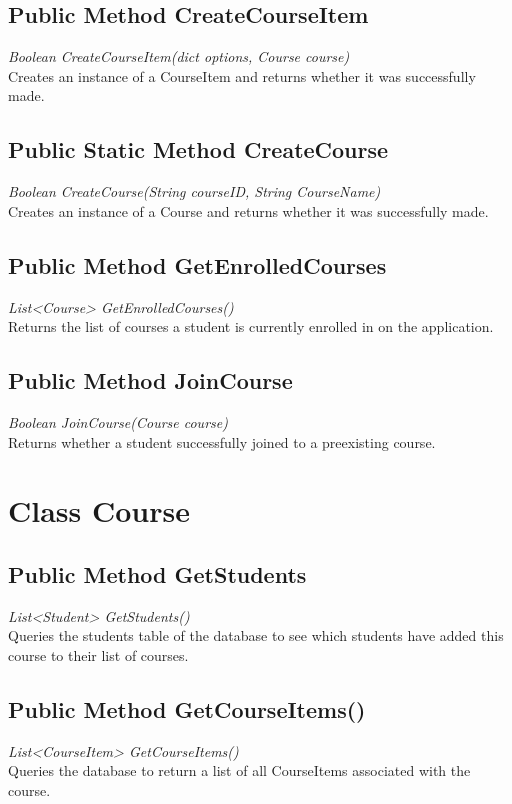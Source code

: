 \documentclass{scrreprt}
\begin{document}
\subsection{Public Method CreateCourseItem}
\textit{Boolean CreateCourseItem(dict options, Course course)} \\
Creates an instance of a CourseItem and returns whether it was 		successfully made.

\subsection{Public Static Method CreateCourse}
\textit{Boolean CreateCourse(String courseID, String CourseName)} \\
Creates an instance of a Course and returns whether it was			 successfully made.

\subsection{Public Method GetEnrolledCourses}
\textit{List<Course> GetEnrolledCourses()} \\
Returns the list of courses a student is currently enrolled in on the application.

\subsection{Public Method JoinCourse}
\textit{Boolean JoinCourse(Course course)} \\
Returns whether a student successfully joined to a preexisting course.

\section{Class Course}

\subsection{Public Method GetStudents}
\textit{List<Student> GetStudents()} \\
Queries the students table of the database to see which students 		have added this course to their list of courses.

\subsection{Public Method GetCourseItems()}
\textit{List<CourseItem> GetCourseItems()} \\
Queries the database to return a list of all CourseItems associated with the course.
\end{document}
